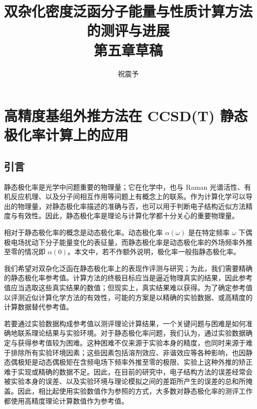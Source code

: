 



\title{\textbf{双杂化密度泛函分子能量与性质计算方法的测评与进展\\第五章草稿}}
\author{祝震予}
\maketitle
\vspace{-10pt}

\tableofcontents


\setcounter{section}{4}

\section{高精度基组外推方法在 CCSD(T) 静态极化率计算上的应用}

\subsection{引言}

静态极化率是光学中问题重要的物理量\cite{Marder-Stucky.ACS.1991}；它在化学中，也与 Raman 光谱活性\cite{Wilson-Cross.Dover.1955}、有机反应机理\cite{Xing-Pei.HEP.2005}、以及分子间相互作用\cite{Cohen-Tannoudji-Laloe.Wiley.2020}等问题上有概念上的联系。作为计算化学可以导出的物理量，对静态极化率描述的准确与否，也可以用于判断电子结构近似方法精度与有效性。因此，静态极化率是理论与计算化学都十分关心的重要物理量。

相对于静态极化率的概念是动态极化率。动态极化率 $\alpha(\omega)$ 是在特定频率 $\omega$ 下偶极电场扰动下分子能量变化的表征量，而静态极化率是动态极化率的外场频率外推至零的情况即 $\alpha(0)$。本文中，若不作额外说明，极化率一般指静态极化率。

我们希望对双杂化泛函在静态极化率上的表现作评测与研究；为此，我们需要精确的静态极化率参考值。计算方法的终极目标应当是逼近物理真实的结果，因此参考值应当选取这些真实结果的数值；但现实上，真实结果难以获得。为了确定参考值以评测近似计算化学方法的有效性，可能的方案是以精确的实验数据、或高精度的计算数据替代参考值。

若要通过实验数据构成参考值以测评理论计算结果，一个关键问题与困难是如何准确地联系理论结果与实验环境\cite{Mata-Suhm.ACIE.2017}。对于静态极化率问题，我们认为，通过实验数据确定与获得参考值较为困难。这种困难不仅来源于实验本身的精度，也同时来源于难于排除所有实验环境因素；这些因素包括溶剂效应、非谐效应等各种影响，也因静态偶极矩是动态偶极矩在含频电场下频率外推至零的极限、实验上这种外推的矫正难于实现或精确的数据不足。因此，在目前的研究中，电子结构方法的误差经常会被实验本身的误差、以及实验环境与理论模拟之间的差距所产生的误差的总和所掩盖\cite{Hickey-Rowley.JPCA.2014}。因此，相比起使用实验数值作为参照的方式\cite{Hickey-Rowley.JPCA.2014}，大多数对静态极化率的测评工作都使用高精度理论计算数值作为参考值\cite{Hammond-Xantheas.JCP.2009, Huzak-Deleuze.JCP.2013, Wu-Thakkar.CPL.2015, Kozlowska-Bartkowiak.PCCP.2019, Hait-Head-Gordon.PCCP.2018, Beizaei-Sauer.JPCA.2021}。

